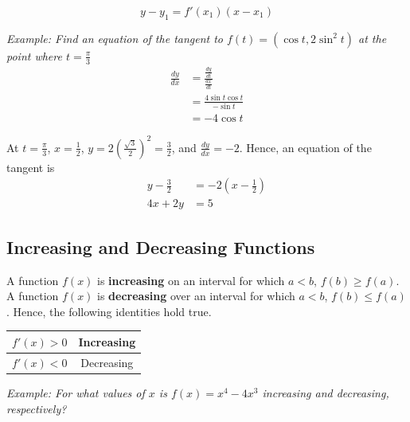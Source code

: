         \begin{equation*}
            y - y_1 = f'(x_1)(x-x_1)
        \end{equation*}

        \noindent \color{blue} \textit{Example: Find an equation of the tangent to
        $f(t)=(\cos{t}, 2\sin^2{t})$ at the point where $t=\frac{\pi}{3}$} \color{black} \\

        \begin{align*}
            \frac{dy}{dx} &= \frac{\frac{dy}{dt}}{\frac{dx}{dt}} \\
            &= \frac{4\sin{t}{\cos{t}}}{-\sin{t}} \\
            &= -4\cos{t}
        \end{align*}

        \noindent At $t=\frac{\pi}{3}$, $x=\frac{1}{2}$,
        $y=2\left(\frac{\sqrt{3}}{2}\right)^2=\frac{3}{2}$, and $\frac{dy}{dx}=-2$.
        Hence, an equation of the tangent is \\

        \begin{align*}
            y - \frac{3}{2} &= -2\left(x-\frac{1}{2}\right) \\
            4x + 2y &= 5
        \end{align*}


    \subsection{Increasing and Decreasing Functions}
        A function $f(x)$ is \textbf{increasing} on an interval for which $a<b$, $f(b)\geq f(a)$.
        A function $f(x)$ is \textbf{decreasing} over an interval for which $a<b$, $f(b)\leq f(a)$.
        Hence, the following identities hold true. \\

        \begin{center}
            \begin{tabular}{|c|c|}
                \hline
                $f'(x)>0$ & Increasing \\
                \hline
                $f'(x)<0$ & Decreasing \\
                \hline
            \end{tabular}
        \end{center}

        \noindent \color{blue} \textit{Example: For what values of $x$ is $f(x)=x^4-4x^3$
        increasing and decreasing, respectively?} \color{black} \\

